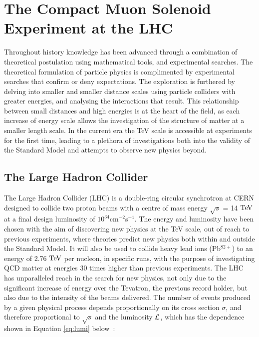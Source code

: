 \chapter{The Compact Muon Solenoid Experiment at the LHC}
\label{ch:detector}

Throughout history knowledge has been advanced through a combination of theoretical postulation using mathematical tools, and experimental searches. The theoretical formulation of particle physics is complimented by experimental searches that confirm or deny expectations. The exploration is furthered by delving into smaller and smaller distance scales using particle colliders with greater energies, and analysing the interactions that result. This relationship between small distances and high energies is at the heart of the field, as each increase of energy scale allows the investigation of the structure of matter at a smaller length scale. In the current era the TeV scale is accessible at experiments for the first time, leading to a plethora of investigations both into the validity of the Standard Model and attempts to observe new physics beyond. 

\section{The Large Hadron Collider}

The Large Hadron Collider (LHC) is a double-ring circular synchrotron at CERN designed to collide two proton beams with a centre of mass energy $\sqrt{s}$  = 14 $\text{TeV}$ at a final design luminosity of $10^{34}$cm$^{-2}$s$^{-1}$. The energy and luminosity have been chosen with the aim of discovering new physics at the TeV scale, out of reach to previous experiments, where theories predict new physics both within and outside the Standard Model. It will also be used to collide heavy lead ions (Pb$^{82+}$) to an energy of 2.76 $\text{TeV}$  per nucleon, in specific runs, with the purpose of investigating QCD matter at energies 30 times higher than previous experiments. 
The LHC has unparalleled reach in the search for new physics, not only due to the significant increase of energy over the Tevatron, the previous record holder, but also due to the intensity of the beams delivered. The number of events produced by a given physical process depends proportionally on its cross section $\sigma$, and therefore proportional to $\sqrt{s}$ and the luminosity $\mathcal{L}$, which has the dependence shown in Equation \ref{eq:lumi} below~\cite{LHCDesign}:

